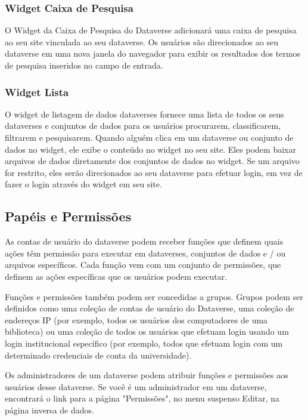 \documentclass[12pt,hidelinks]{article}
\begin{document}
        \subsubsection{Widget Caixa de Pesquisa}
    
\qquad O Widget da Caixa de Pesquisa do Dataverse adicionará uma caixa de pesquisa ao seu site vinculada ao seu dataverse. Os usuários são direcionados ao seu dataverse em uma nova janela do navegador para exibir os resultados dos termos de pesquisa inseridos no campo de entrada.
    
        \subsubsection{Widget Lista}

\qquad O widget de listagem de dados dataverses fornece uma lista de todos os seus dataverses e conjuntos de dados para os usuários procurarem, classificarem, filtrarem e pesquisarem. Quando alguém clica em um dataverse ou conjunto de dados no widget, ele exibe o conteúdo no widget no seu site. Eles podem baixar arquivos de dados diretamente dos conjuntos de dados no widget. Se um arquivo for restrito, eles serão direcionados ao seu dataverse para efetuar login, em vez de fazer o login através do widget em seu site.
    
    \subsection{Papéis e Permissões}
    
\qquad As contas de usuário do dataverse podem receber funções que definem quais ações têm permissão para executar em dataverses, conjuntos de dados e / ou arquivos específicos. Cada função vem com um conjunto de permissões, que definem as ações específicas que os usuários podem executar.

Funções e permissões também podem ser concedidas a grupos. Grupos podem ser definidos como uma coleção de contas de usuário do Dataverse, uma coleção de endereços IP (por exemplo, todos os usuários dos computadores de uma biblioteca) ou uma coleção de todos os usuários que efetuam login usando um login institucional específico (por exemplo, todos que efetuam login com um determinado credenciais de conta da universidade).

Os administradores de um dataverse podem atribuir funções e permissões aos \\usuários desse dataverse. Se você é um administrador em um dataverse, encontrará o link para a página "Permissões", no menu suspenso Editar, na página inversa de dados.
\end{document}
